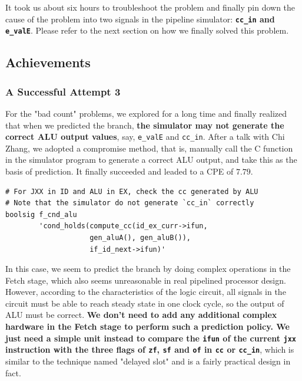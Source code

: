 \documentclass[12pt,a4paper]{article}
\begin{document}
It took us about six hours to troubleshoot the problem and finally pin down the cause of the problem into two signals in the pipeline simulator: \textbf{\texttt{cc\_in} and \texttt{e\_valE}}. Please refer to the next section on how we finally solved this problem.
\subsection{Achievements}
\subsubsection{A Successful Attempt 3}
For the "bad count" problems, we explored for a long time and finally realized that when we predicted the branch, \textbf{the simulator may not generate the correct ALU output values}, say, \texttt{e\_valE} and \texttt{cc\_in}. After a talk with Chi Zhang, we adopted a compromise method, that is, manually call the C function in the simulator program to generate a correct ALU output, and take this as the basis of prediction. It finally succeeded and leaded to a CPE of $7.79$.

\begin{lstlisting}
# For JXX in ID and ALU in EX, check the cc generated by ALU
# Note that the simulator do not generate `cc_in` correctly
boolsig f_cnd_alu 
        'cond_holds(compute_cc(id_ex_curr->ifun, 
                    gen_aluA(), gen_aluB()), 
                    if_id_next->ifun)'
\end{lstlisting}

In this case, we seem to predict the branch by doing complex operations in the Fetch stage, which also seems unreasonable in real pipelined processor design. However, according to the characteristics of the logic circuit, all signals in the circuit must be able to reach steady state in one clock cycle, so the output of ALU must be correct. \textbf{We don't need to add any additional complex hardware in the Fetch stage to perform such a prediction policy. We just need a simple unit instead to compare the \texttt{ifun} of the current \texttt{jxx} instruction with the three flags of \texttt{zf}, \texttt{sf} and \texttt{of} in \texttt{cc} or \texttt{cc\_in}}, which is similar to the technique named "delayed slot" and is a fairly practical design in fact. 
\end{document}
